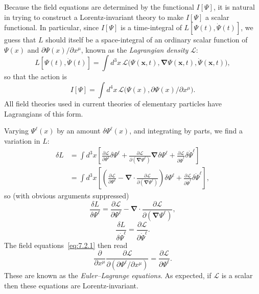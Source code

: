 Because the field equations are determined by the functional $I[\Psi]$,
it is natural in trying to construct a Lorentz-invariant theory to make
$I[\Psi]$ a scalar functional. In particular, since $I[\Psi]$ is a time-integral
of $L[\Psi(t),\dot\Psi(t)]$, we guess that $L$ should itself be a space-integral of an
ordinary scalar function of $\Psi(x)$ and $\partial\Psi(x)/\partial x^\mu$, known
as the \textit{Lagrangian density} $\mathcal{L}$:
\begin{equation}
L[\Psi(t),\dot\Psi(t)]=\int d^3x\,
\mathcal{L}\bigl(\Psi(\mathbf{x},t),\boldsymbol{\nabla}\Psi(\mathbf{x},t),
\dot\Psi(\mathbf{x},t)\bigr),
\tag{7.2.5}\label{eq:7.2.5}
\end{equation}
so that the action is
\begin{equation}
I[\Psi]=\int d^4x\,
\mathcal{L}\bigl(\Psi(x),\partial\Psi(x)/\partial x^\mu\bigr).
\tag{7.2.6}\label{eq:7.2.6}
\end{equation}
All field theories used in current theories of elementary particles have
Lagrangians of this form.

Varying $\Psi^\ell(x)$ by an amount $\delta\Psi^\ell(x)$, and integrating by parts,
we find a variation in $L$:
\begin{align*}
\delta L
&=\int d^3x\left[
\frac{\partial\mathcal{L}}{\partial\Psi^\ell}\delta\Psi^\ell
+\frac{\partial\mathcal{L}}{\partial(\boldsymbol{\nabla}\Psi^\ell)}
\boldsymbol{\nabla}\delta\Psi^\ell
+\frac{\partial\mathcal{L}}{\partial\dot\Psi^\ell}\delta\dot\Psi^\ell
\right]
\\
&=\int d^3x\left[
\left(\frac{\partial\mathcal{L}}{\partial\Psi^\ell}
-\boldsymbol{\nabla}\cdot
\frac{\partial\mathcal{L}}{\partial(\boldsymbol{\nabla}\Psi^\ell)}\right)
\delta\Psi^\ell
+\frac{\partial\mathcal{L}}{\partial\dot\Psi^\ell}\delta\dot\Psi^\ell
\right],
\end{align*}
so (with obvious arguments suppressed)
\begin{equation}
\frac{\delta L}{\delta\Psi^\ell}
=\frac{\partial\mathcal{L}}{\partial\Psi^\ell}
-\boldsymbol{\nabla}\cdot
\frac{\partial\mathcal{L}}{\partial(\boldsymbol{\nabla}\Psi^\ell)},
\tag{7.2.7}\label{eq:7.2.7}
\end{equation}
\begin{equation}
\frac{\delta L}{\delta\dot\Psi^\ell}
=\frac{\partial\mathcal{L}}{\partial\dot\Psi^\ell}.
\tag{7.2.8}\label{eq:7.2.8}
\end{equation}
The field equations~\eqref{eq:7.2.1} then read
\begin{equation}
\frac{\partial}{\partial x^\mu}
\frac{\partial\mathcal{L}}{\partial(\partial\Psi^\ell/\partial x^\mu)}
=\frac{\partial\mathcal{L}}{\partial\Psi^\ell}.
\tag{7.2.9}\label{eq:7.2.9}
\end{equation}
These are known as the \textit{Euler--Lagrange equations}. As expected, if
$\mathcal{L}$ is a scalar then these equations are Lorentz-invariant.

